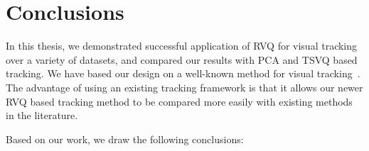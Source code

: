 \chapter{Conclusions}
\label{chap_conclusions}	

In this thesis, we demonstrated successful application of RVQ for visual tracking over a variety of datasets, and compared our results with PCA and TSVQ based tracking.  We have based our design on a well-known method for visual tracking~\cite{2008_JNL_subspaceTRK_Ross}.  The advantage of using an existing tracking framework is that it allows our newer RVQ based tracking method to be compared more easily with existing methods in the literature.

Based on our work, we draw the following conclusions:

